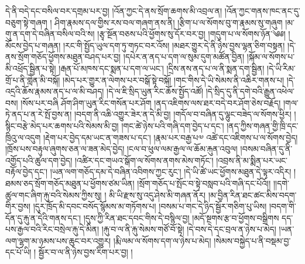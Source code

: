 དེ་ནི་བདེ་དང་བསིལ་བར་དགྲམ་པར་བྱ། །འོན་ཀྱང་དེ་ནས་སྲོག་ཆགས་མི་འབྲལ་ན། །འོན་ཀྱང་གནས་ཁང་ནང་དུ་བཅུག་སྟེ་གཞག ། ཤིག་རྣམས་དལ་གྱིས་རས་བལ་གཞག་ནས་ནི། །རྩིག་པ་ལ་སོགས་བུ་ག་རྣམས་སུ་གཞུག །མ་གུ་ན་དག་དེ་བཞིན་བསིལ་བའི་ས། །རྩྭ་སྔོན་བཅས་པའི་ཕྱོགས་སུ་དོར་བར་བྱ། །གདུག་པ་ལ་སོགས་ཉོན་༄༅། །མོངས་བྱེད་པ་གཞན། །རང་གི་སྤྱོད་ཡུལ་དག་ཏུ་གཏང་བར་འོས། །མཐར་གྱུར་དེ་ནི་ཉེས་བྱས་ལྷན་ཅིག་བསྟན། །དེ་ནས་སྲོག་གཅོད་ཕྱོགས་མཐུན་བཤད་པར་བྱ། །དཔེར་ན་ནད་པ་དག་ལ་སུམ་དུག་མཚོན་བྱིན། །སྐོམ་ལ་སོགས་པ་མི་འཕྲོད་སྦྱིན་པ་སྟེ། །རྒན་པོ་མཁས་དང་སྨན་པ་དག་ལ་ཡང་། །དྲིས་ནས་ནད་པ་ལ་ནི་སྨན་དག་སྦྱིན། །དེ་ཡི་རིམ་གྲོ་པ་ནི་གླེན་མི་བསྐོ། །མེད་པར་གྱུར་ན་ལེགས་པར་བསྒོ་སྟེ་བསྐོ། །གང་གིས་དེ་ཡི་སེམས་ནི་འཆིར་གནས་པ། །དེ་འདྲའི་ཆོས་རྣམས་ནད་པ་ལ་མི་བཤད། །དེ་ལ་ཇི་སྲིད་ཡུན་རིང་ཆོས་སྤྱོད་འཚོ། །དེ་སྲིད་དུ་ནི་དགེ་བའི་རྒྱུན་འཕེལ་བས། །སོས་པར་བཞི ཤོག་ཤིག་ཡུན་རིང་གསོན་པར་ཤོག །ནད་འཇིགས་ལས་ཐར་བདེ་བར་ཤོག་ཅེས་བརྗོད། །གལ་ཏེ་ནད་པ་ན་རེ་སྤོ་བྱས་ན། །བདག་ནི་འཆི་འགྱུར་ཟེར་ན་དེ་མི་བྱ། །གདོལ་བ་བཞིན་དུ་ལྷུང་བཟེད་ལ་སོགས་ཕྱིར། །སྙིང་བརྩེ་མེད་པར་ཆགས་པའི་སེམས་མི་བྱ། །གང་ཚེ་ཉེས་པའི་གཞི་དག་བྱེད་པ་དང་། །ནད་ཀྱིས་གཞན་གྱི་ཁྲི་དང་ཁྲིའུ་ལ་འདུག །རྡེག་པར་བྱེད་དམ་ཡང་ན་གཟས་པ་དང་། །རྣམ་པར་བརྒྱ་པ༧ འཚེ་དང་འཇིགས་པ་ལ་སོགས་བྱེད། །ཁྲོས་པས་བརྟུལ་ཞུགས་ཅན་ལ་ཟན་མེད་བྱེད། །ངལ་བ་ཕུལ་ལམ་རྒྱལ་ལ་ཆོམ་རྐུན་འབུལ། །བསམ་བཞིན་དུ་ནི་འགྱོད་པའི་ཚུལ་དག་བྱེད། །འཚིར་དང་གཡའ་སྒོག་ལ་སོགས་ནགས་མེས་གཏོང་། །འབྲས་ནི་མ་སྨིན་པར་ཡང་བརྟོལ་བྱེད་དང་། །ཡན་ལག་གཅོད་དམ་དེ་བཞིན་འབིགས་ཀྱང་རུང་། །དེ་ཡི་ཚེ་ཡང་ཕྱོགས་མཐུན་དེ་ལྟར་འདིར། །ཐམས་ཅད་སྲོག་གཅོད་མཐུན་པ་ཕྱོགས་ཙམ་ཡིན། །སྲོག་གཅོད་པ་སྤོང་བ་སྟེ་བསླབ་པའི་གཞི་དང་པོའོ།། །།དགེ་ཚུལ་གང་ཞིག་རྐུ་བའི་སེམས་ཀྱིས་སུ། ། མི་ཡི་རྫས་སུ་འདུ་ཤེས་མི་གཞན་ནོར། །མ་བྱིན་རིན་ཐང་ཚང་མིས་བདག་གིར་བྱས། །དུར་ཁྲོད་མི་དབང་བསོད་སྙོམས་མ་གཏོགས་པ། །བསམ་པ་གང་དེ་ཉིད་སྦྱོར་གཅིག་པུ་ཡིས། །བདག་གི་དོན་དུ་རྐུ་ན་དེའི་གནས་དང་། །དུས་ཀྱི་རིན་ཐང་དབང་གིས་དེ་བསྙིལ་བྱ། །མདོ་སྔགས་རྩ་བ་ཕྱོགས་བསྒྲིགས དད་པས་རྒྱལ་བའི་རིང་བསྲེལ་རྐུ་དེ་མིན། །རྐུ་བ་ལ་ནི་རྐུ་སེམས་གཙོ་བོ་སྟེ། །དེ་བས་དེ་དང་བྲལ་ན་ཉེས་པ་མེད། །ཡན་ལག་ལྷག་མ་ཉམས་པས་ཆུང་བར་འགྱུར། །རྨི་ལམ་ལ་སོགས་དག་ལ་ཉེས་པ་མེད། །སེམས་བསྐྱེད་པ་ནི་བསྡམ་བྱ་དང་པོ་ཡི། ། སྦྱོར་བ་ལ་ནི་ཉེས་བྱས་རིག་པར་བྱ། །
